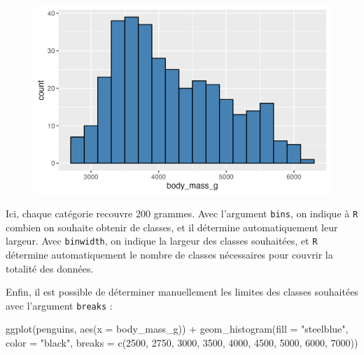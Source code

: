 \documentclass[
  letterpaper,
  DIV=11,
  numbers=noendperiod]{scrreprt}
\newenvironment{Shaded}{\begin{snugshade}}{\end{snugshade}}
\newcommand{\AttributeTok}[1]{\textcolor[rgb]{0.40,0.45,0.13}{#1}}
\newcommand{\DecValTok}[1]{\textcolor[rgb]{0.68,0.00,0.00}{#1}}
\newcommand{\FunctionTok}[1]{\textcolor[rgb]{0.28,0.35,0.67}{#1}}
\newcommand{\NormalTok}[1]{\textcolor[rgb]{0.00,0.23,0.31}{#1}}
\newcommand{\SpecialCharTok}[1]{\textcolor[rgb]{0.37,0.37,0.37}{#1}}
\newcommand{\StringTok}[1]{\textcolor[rgb]{0.13,0.47,0.30}{#1}}
\begin{document}
\begin{figure}[H]

{\centering \includegraphics{./03-visualization_files/figure-pdf/unnamed-chunk-16-1.png}

}

\end{figure}

Ici, chaque catégorie recouvre 200 grammes. Avec l'argument
\texttt{bins}, on indique à \texttt{R} combien on souhaite obtenir de
classes, et il détermine automatiquement leur largeur. Avec
\texttt{binwidth}, on indique la largeur des classes souhaitées, et
\texttt{R} détermine automatiquement le nombre de classes nécessaires
pour couvrir la totalité des données.

Enfin, il est possible de déterminer manuellement les limites des
classes souhaitées avec l'argument \texttt{breaks} :

\begin{Shaded}
\begin{Highlighting}[]
\FunctionTok{ggplot}\NormalTok{(penguins, }\FunctionTok{aes}\NormalTok{(}\AttributeTok{x =}\NormalTok{ body\_mass\_g)) }\SpecialCharTok{+}
  \FunctionTok{geom\_histogram}\NormalTok{(}\AttributeTok{fill =} \StringTok{"steelblue"}\NormalTok{, }\AttributeTok{color =} \StringTok{"black"}\NormalTok{,}
                 \AttributeTok{breaks =} \FunctionTok{c}\NormalTok{(}\DecValTok{2500}\NormalTok{, }\DecValTok{2750}\NormalTok{, }\DecValTok{3000}\NormalTok{, }\DecValTok{3500}\NormalTok{, }\DecValTok{4000}\NormalTok{, }\DecValTok{4500}\NormalTok{, }\DecValTok{5000}\NormalTok{, }\DecValTok{6000}\NormalTok{, }\DecValTok{7000}\NormalTok{))}
\end{Highlighting}
\end{Shaded}
\end{document}

